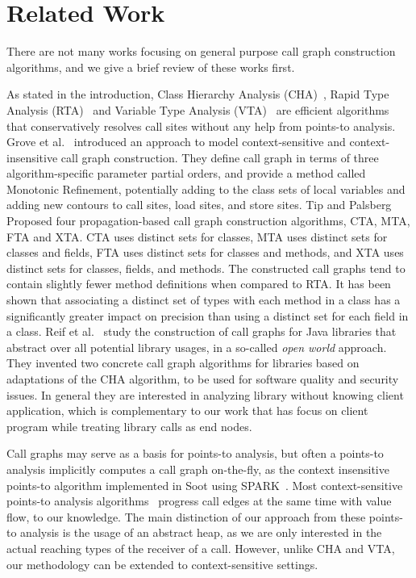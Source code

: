 \documentclass{llncs}
\begin{document}
\section{Related Work}\label{sec:related-work}

There are not many works focusing on general purpose call graph construction algorithms, and we give a brief review of these works first.

As stated in the introduction, Class Hierarchy Analysis (CHA)~\cite{Dean1995,Fernandez1995}, Rapid Type Analysis (RTA)~\cite{Bacon1996} and Variable Type Analysis (VTA)~\cite{Sundaresan2000} are efficient algorithms that conservatively resolves call sites without any help from points-to analysis. Grove et al.~\cite{Grove1997} introduced an approach to model context-sensitive and context-insensitive call graph construction. They define call graph in terms of three algorithm-specific parameter partial orders, and provide a method called Monotonic Refinement, potentially adding to the class sets of local variables and adding new contours to call sites, load sites, and store sites. Tip and Palsberg~\cite{Tip2000} Proposed four propagation-based call graph construction algorithms, CTA, MTA, FTA and XTA. CTA uses distinct sets for classes, MTA uses distinct sets for classes and fields, FTA uses distinct sets for classes and methods, and XTA uses distinct
sets for classes, fields, and methods. The constructed call graphs tend to contain slightly fewer method definitions when compared to RTA. It has been shown that associating a distinct set of types with each method in a class has a significantly greater impact on precision than using a distinct set for each field in a class. Reif et al.~\cite{Reif2016} study the construction of call graphs for Java libraries that abstract over all potential library usages, in a so-called \emph{open world} approach. They invented two concrete call graph algorithms for libraries based on adaptations of the CHA algorithm, to be used for software quality and security issues. In general they are interested in analyzing library without knowing client application, which is complementary to our work that has focus on client program while treating library calls as end nodes.

Call graphs may serve as a basis for points-to analysis, but often a points-to analysis implicitly computes a call graph on-the-fly, as the context insensitive points-to algorithm implemented in Soot using SPARK~\cite{Lhotak2003}. Most context-sensitive points-to analysis algorithms~\cite{Milanova2005,Sridharan2006,Smaragdakis11,Tan16} progress call edges at the same time with value flow, to our knowledge. The main distinction of our approach from these points-to analysis is the usage of an abstract heap, as we are only interested in the actual reaching types of the receiver of a call. However, unlike CHA and VTA, our methodology can be extended to context-sensitive settings.
\end{document}
